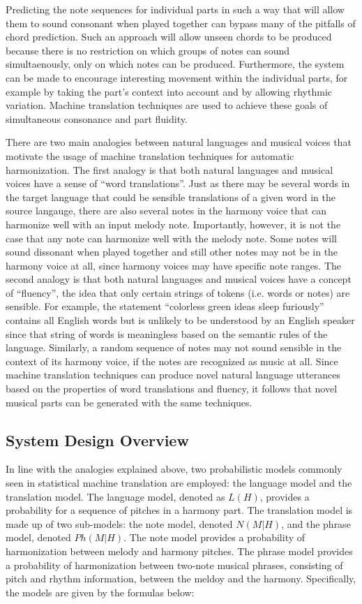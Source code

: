 \documentclass{sig-alternate}
\begin{document}
Predicting the note sequences for individual parts in such a way that will allow them to sound consonant when played together can bypass many of the pitfalls of chord prediction. 
Such an approach will allow unseen chords to be produced because there is no restriction on which groups of notes can sound simultaenously, only on which notes can be produced. Furthermore, the system can be made to encourage interesting movement within the individual parts, for example by taking the part's context into account and by allowing rhythmic variation. Machine translation techniques are used to achieve these goals of simultaneous consonance and part fluidity.

There are two main analogies between natural languages and musical voices that motivate the usage of machine translation techniques for automatic harmonization. The first analogy is that both natural languages and musical voices have a sense of ``word translations''. Just as there may be several words in the target language that could be sensible translations of a given word in the source 
langauge, there are also several notes in the harmony voice that can harmonize well with an input melody note. Importantly, however, it is not the case that any note can harmonize well with the melody note. Some notes will sound dissonant when played together and still other notes may not be in the harmony voice at all, since harmony voices may have specific note ranges. The second analogy is that both natural languages and musical voices have a concept of ``fluency'', the idea that only certain strings of tokens (i.e. words or notes) are sensible. For example, the statement ``colorless green ideas sleep furiously'' contains all English words but is unlikely to be understood by an English speaker since that string of words is meaningless based on the semantic rules of the language. Similarly, a random sequence of notes may not sound sensible in the context of its harmony voice, if the notes are recognized as music at all. Since machine translation techniques can produce novel natural language utterances based on the properties of word translations and fluency, it follows that novel musical parts can be generated with the same techniques.

\subsection{System Design Overview}

In line with the analogies explained above, two probabilistic models commonly seen in statistical machine translation are employed: the language model and the translation model. The language model, denoted as $L(H)$, provides a probability for a sequence of pitches in a harmony part. The translation model is made up of two sub-models: the note model, denoted $N(M|H)$, and the phrase model, denoted $Ph(M|H)$. The note model provides a probability of harmonization between melody and harmony pitches. The phrase model provides a probability of harmonization between two-note musical phrases, consisting of pitch and rhythm information, between the meldoy and the harmony. Specifically, the models are given by the formulas below: 
\\
\end{document}
